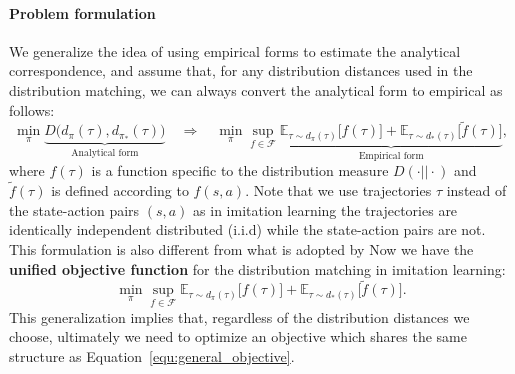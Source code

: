 
\paragraph{Problem formulation} We generalize the idea of using empirical forms to estimate the analytical correspondence, and assume that, for any distribution distances used in the distribution matching, we can always convert the analytical form to empirical as follows:
\begin{equation*}
\min_{\pi} \underbrace{D\big(d_{\pi}(\tau), d_{\pi_*}(\tau)\big)}_{\text{Analytical form}} \quad \Rightarrow \quad \min_{\pi} \sup_{f\in\mathcal{F}} \underbrace{ \mathbb{E}_{\tau\sim d_{\pi}(\tau)} \big[ f(\tau) \big] + \mathbb{E}_{\tau\sim d_*(\tau)} \big[\tilde{f}(\tau) \big]}_{\text{Empirical form}},
\end{equation*}
where $f(\tau)$ is a function specific to the distribution measure $D(\cdot||\cdot)$ and $\tilde{f}(\tau)$ is defined according to $f(s, a)$.   
Note that we use trajectories $\tau$ instead of the state-action pairs $(s, a)$ as in imitation learning the trajectories are identically independent distributed (i.i.d) while the state-action pairs are not. 
This formulation is also different from what is adopted by 
Now we have the \textbf{unified objective function} for the distribution matching in imitation learning:
\begin{equation}\label{equ:general_objective}
\min_{\pi} \sup_{f\in\mathcal{F}} \mathbb{E}_{\tau\sim d_{\pi}(\tau)} \big[ f(\tau) \big] + \mathbb{E}_{\tau\sim d_*(\tau)} \big[\tilde{f}(\tau) \big].
\end{equation}
This generalization implies that, regardless of the distribution distances we choose, ultimately we need to optimize an objective which shares the same structure as Equation~\ref{equ:general_objective}. 

